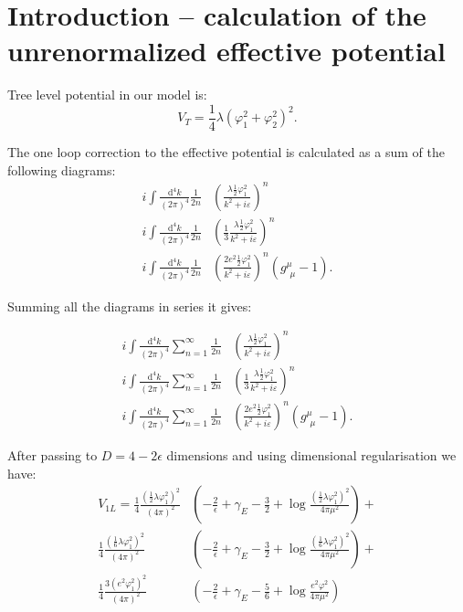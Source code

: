 \chapter{Introduction -- calculation of the unrenormalized effective potential}

Tree level potential in our model is:
\begin{equation}
V_T = \frac{1}{4}\lambda(\varphi_1^2+\varphi_2^2)^2.
\end{equation}


The one loop correction to the effective potential is calculated as a sum of the following diagrams:
\\
\begin{align}
i\int \frac{\textrm{d}^4k}{(2\pi)^4}\frac{1}{2n}&\left(\frac{\lambda\frac{1}{2}\varphi_1^2}
{k^2+i\varepsilon}\right)^n \\
i\int \frac{\textrm{d}^4k}{(2\pi)^4}\frac{1}{2n}&\left(\frac{1}{3}\frac{\lambda\frac{1}
{2}\varphi_1^2}
{k^2+i\varepsilon}\right)^n \\
i\int \frac{\textrm{d}^4k}{(2\pi)^4}\frac{1}{2n}&\left(\frac{2e^2\frac{1}{2}\varphi_1^2}
{k^2+i\varepsilon}\right)^n(g^\mu_{\ \,\mu} - 1).
\end{align}

Summing all the diagrams in series it gives:

\begin{align}
i\int \frac{\textrm{d}^4k}{(2\pi)^4}\sum\limits_{n=1}^{\infty}
\frac{1}{2n}&\left(\frac{\lambda\frac{1}{2}\varphi_1^2}
{k^2+i\varepsilon}\right)^n \\
i\int \frac{\textrm{d}^4k}{(2\pi)^4}\sum\limits_{n=1}^{\infty}\frac{1}{2n}&
\left(\frac{1}{3}\frac{\lambda\frac{1}{2}\varphi_1^2}
{k^2+i\varepsilon}\right)^n \\
i\int \frac{\textrm{d}^4k}{(2\pi)^4}\sum\limits_{n=1}^{\infty}\frac{1}{2n}&
\left(\frac{2e^2\frac{1}{2}\varphi_1^2}
{k^2+i\varepsilon}\right)^n(g^\mu_{\ \,\mu} - 1).
\end{align}

After passing to $D=4-2\epsilon$ dimensions and using dimensional regularisation we have:
\begin{align}
V_{1L}=\frac{1}{4}\frac{(\frac{1}{2}\lambda\varphi_1^2)^2}{(4\pi)^2}&\left(-\frac{2}{\epsilon}
+\gamma_E-\frac{3}{2}+\log{\frac{(\frac{1}{2}\lambda\varphi_1^2)^2}{4\pi\mu^2}}\right) + \\
\frac{1}{4}\frac{(\frac{1}{6}\lambda\varphi_1^2)^2}{(4\pi)^2}&\left(-\frac{2}{\epsilon}
+\gamma_E-\frac{3}{2}+\log{\frac{(\frac{1}{6}\lambda\varphi_1^2)^2}{4\pi\mu^2}}\right) + \\
\frac{1}{4}\frac{3(e^2\varphi_1^2)^2}{(4\pi)^2}&\left(-\frac{2}{\epsilon}+\gamma_E
-\frac{5}{6}+\log{\frac{e^2\varphi^2}{4\pi\mu^2}}\right)
\end{align}
